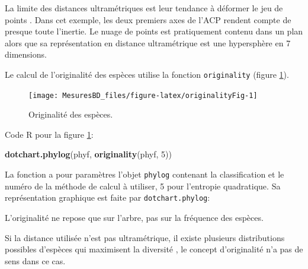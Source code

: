 \documentclass[
  11pt,
  french,
  a4paper,
  extrafontsizes,onecolumn,openright
  ]{memoir}
\newenvironment{Shaded}{\begin{snugshade}}{\end{snugshade}}
\newcommand{\DecValTok}[1]{\textcolor[rgb]{0.00,0.00,0.81}{#1}}
\newcommand{\FunctionTok}[1]{\textcolor[rgb]{0.13,0.29,0.53}{\textbf{#1}}}
\newcommand{\NormalTok}[1]{#1}
\newcommand{\SpecialCharTok}[1]{\textcolor[rgb]{0.81,0.36,0.00}{\textbf{#1}}}
\begin{document}
\scriptsize

\begin{Shaded}
\end{Shaded}

\normalsize

La limite des distances ultramétriques est leur tendance à déformer le jeu de points \autocite{Pavoine2005a}.
Dans cet exemple, les deux premiers axes de l'ACP rendent compte de presque toute l'inertie.
Le nuage de points est pratiquement contenu dans un plan alors que sa représentation en distance ultramétrique est une hypersphère en 7 dimensions.

Le calcul de l'originalité des espèces utilise la fonction \texttt{originality} (figure \ref{fig:originalityFig}).

\scriptsize

\begin{figure}

{\centering \texttt{[image: MesuresBD\_files/figure-latex/originalityFig-1]} 

}

\caption{Originalité des espèces.}\label{fig:originalityFig}
\end{figure}

\normalsize

Code R pour la figure \ref{fig:originalityFig}:

\scriptsize

\begin{Shaded}
\begin{Highlighting}[]
\FunctionTok{dotchart.phylog}\NormalTok{(phyf, }\FunctionTok{originality}\NormalTok{(phyf, }\DecValTok{5}\NormalTok{))}
\end{Highlighting}
\end{Shaded}

\normalsize

La fonction a pour paramètres l'objet \texttt{phylog} contenant la classification et le numéro de la méthode de calcul à utiliser, 5 pour l'entropie quadratique.
Sa représentation graphique est faite par \texttt{dotchart.phylog}:

L'originalité ne repose que sur l'arbre, pas sur la fréquence des espèces.

Si la distance utilisée n'est pas ultramétrique, il existe plusieurs distributions possibles d'espèces qui maximisent la diversité \autocite{Pavoine2009}, le concept d'originalité n'a pas de sens dans ce cas.
\end{document}
